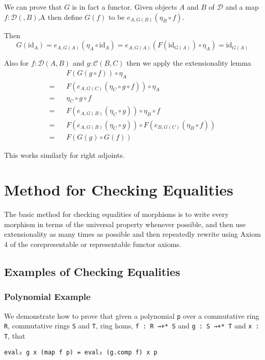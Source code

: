 \documentclass[12pt]{article} %
\theoremstyle{definition}
\theoremstyle{definition}
\theoremstyle{definition}
\theoremstyle{definition}
\begin{document}
We can prove that $G$ is in fact a functor. 
Given objects $A$ and $B$ of $\mathcal{D}$ and a map $f : \mathcal{D}(, B)$,A
then define $G(f)$ to be $e_{A,G(B)}(\eta_B \circ f)$.

Then 
\begin{equation}
  G(\text{id}_A) = e_{A,G(A)}(\eta_A \circ \text{id}_A) = 
e_{A,G(A)}(F (\text{id}_{G(A)}) \circ \eta_A) = \text{id}_{G(A)}
\end{equation}

Also for $f : \mathcal{D}(A, B)$ and $g : \mathcal{C}(B, C)$
then we apply the extensionality lemma
\begin{equation}
  \begin{aligned}
     && F(G(g \circ f)) \circ \eta_A \\
   = && F(e_{A, G(C)}(\eta_C \circ g \circ f)) \circ \eta_A \\
   = && \eta_C \circ g \circ f \\
   = && F(e_{A, G(B)}(\eta_C \circ g)) \circ \eta_B \circ f \\
   = && F(e_{A, G(B)}(\eta_C \circ g)) \circ F(e_{B, G(C)}(\eta_B \circ f)) \\
   = && F(G(g) \circ G(f))
  \end{aligned}
\end{equation}

This works similarly for right adjoints.

\section{Method for Checking Equalities}

The basic method for checking equalities of morphisms is to write every morphism in terms of 
the universal property whenever possible, and then use extensionality as many times
as possible and then repeatedly 
rewrite using Axiom 4 of the corepresentable or representable functor axioms.

\subsection{Examples of Checking Equalities}

\subsubsection{Polynomial Example}
We demonstrate how to prove that given a polynomial
\lstinline{p} over a commutative ring \lstinline{R}, commutative rings
\lstinline{S} and \lstinline{T}, ring homs,
\lstinline{f : R →+* S} and \lstinline{g : S →+* T} and \lstinline{x : T},
that 
\begin{lstlisting}
eval₂ g x (map f p) = eval₂ (g.comp f) x p
\end{lstlisting}
\end{document}

